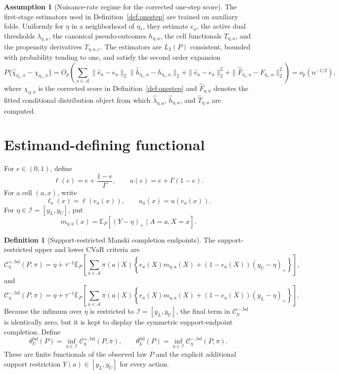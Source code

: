 \documentclass[11pt]{article}
\newcommand{\E}{\mathbb{E}}
\theoremstyle{definition}
\newtheorem{definition}{Definition}
\newtheorem{assumption}{Assumption}
\theoremstyle{plain}
\theoremstyle{remark}
\begin{document}
\begin{assumption}[Nuisance-rate regime for the corrected one-step score]\label{ass:nuisance}
The first-stage estimators used in Definition~\ref{def:onestep} are trained on
auxiliary folds.  Uniformly for \(\eta\) in a neighborhood of \(\eta_*\), they
estimate \(e_a\), the active dual thresholds \(\lambda_{\eta,a}\), the canonical
pseudo-outcomes \(h_{\eta,a}\), the cell functionals \(T_{\eta,a}\), and the
propensity derivatives \(\dot T_{\eta,a,e}\).  The estimators are \(L_2(P)\)
consistent, bounded with probability tending to one, and satisfy the second
order expansion
\[
P\{\widehat\chi_{\eta_*,\pi}-\chi_{\eta_*,\pi}\}
=
O_p\!\left(
\sum_{a\in\mathcal A}
\|\widehat e_a-e_a\|_2\|\widehat h_{\eta_*,a}-h_{\eta_*,a}\|_2
+\|\widehat e_a-e_a\|_2^2
+\|\widehat F_{\eta_*,a}-F_{\eta_*,a}\|_2^2
\right)
=o_p(n^{-1/2}),
\]
where \(\chi_{\eta,\pi}\) is the corrected score in Definition~\ref{def:onestep}
and \(\widehat F_{\eta,a}\) denotes the fitted conditional distribution object
from which \(\widehat\lambda_{\eta,a}\), \(\widehat h_{\eta,a}\), and
\(\widehat T_{\eta,a}\) are computed.
\end{assumption}

\section{Estimand-defining functional}
\label{sec:functional}
For \(e\in(0,1)\), define
\[
\ell(e)=e+\frac{1-e}{\Gamma},
\qquad
u(e)=e+\Gamma(1-e).
\]
For a cell \((a,x)\), write
\[
\ell_a(x)=\ell(e_a(x)),
\qquad
u_a(x)=u(e_a(x)).
\]
For \(\eta\in\mathcal I=[y_L,y_U]\), put
\[
m_{\eta,a}(x)=\E_P[(Y-\eta)_+\mid A=a,X=x].
\]

\begin{definition}[Support-restricted Manski completion endpoints]\label{def:bd-endpoints}
The support-restricted upper and lower CVaR criteria are
\[
\mathcal C_\eta^{+,\mathrm{bd}}(P,\pi)
=
\eta+\tau^{-1}
\E_P\left[
\sum_{a\in\mathcal A}\pi(a\mid X)
\left\{
e_a(X)m_{\eta,a}(X)
+
(1-e_a(X))(y_U-\eta)_+
\right\}
\right],
\]
and
\[
\mathcal C_\eta^{-,\mathrm{bd}}(P,\pi)
=
\eta+\tau^{-1}
\E_P\left[
\sum_{a\in\mathcal A}\pi(a\mid X)
\left\{
e_a(X)m_{\eta,a}(X)
+
(1-e_a(X))(y_L-\eta)_+
\right\}
\right].
\]
Because the infimum over \(\eta\) is restricted to
\(\mathcal I=[y_L,y_U]\), the final term in
\(\mathcal C_\eta^{-,\mathrm{bd}}\) is identically zero, but it is kept to
display the symmetric support-endpoint completion.  Define
\[
\theta_U^{\mathrm{bd}}(P)
=
\inf_{\eta\in\mathcal I}
\mathcal C_\eta^{+,\mathrm{bd}}(P,\pi),
\qquad
\theta_L^{\mathrm{bd}}(P)
=
\inf_{\eta\in\mathcal I}
\mathcal C_\eta^{-,\mathrm{bd}}(P,\pi).
\]
These are finite functionals of the observed law \(P\) and the explicit
additional support restriction \(Y(a)\in[y_L,y_U]\) for every action.
\end{definition}
\end{document}
